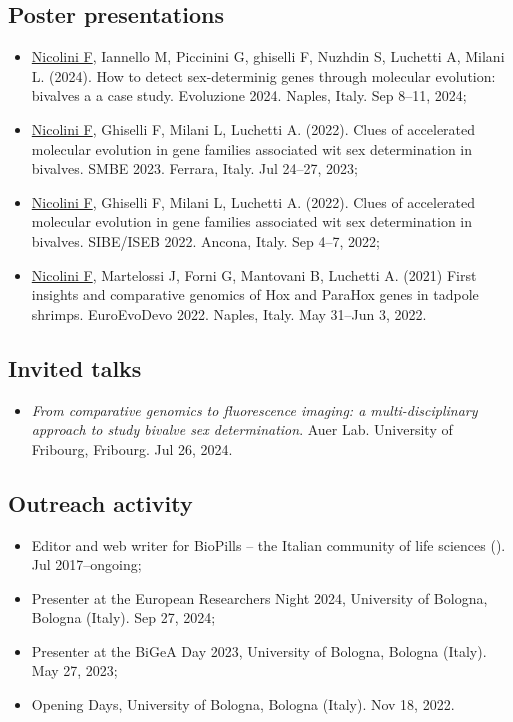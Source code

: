 \subsection*{Poster presentations}
\begin{itemize}
    \item \underline{Nicolini F}, Iannello M, Piccinini G, ghiselli F, Nuzhdin S, Luchetti A, Milani L. (2024). How to detect sex-determinig genes through molecular evolution: bivalves a a case study. Evoluzione 2024. Naples, Italy. Sep 8--11, 2024;
    \item \underline{Nicolini F}, Ghiselli F, Milani L, Luchetti A. (2022). Clues of accelerated molecular evolution in gene families associated wit sex determination in bivalves. SMBE 2023. Ferrara, Italy. Jul 24--27, 2023;
    \item \underline{Nicolini F}, Ghiselli F, Milani L, Luchetti A. (2022). Clues of accelerated molecular evolution in gene families associated wit sex determination in bivalves. SIBE/ISEB 2022. Ancona, Italy. Sep 4--7, 2022;
    \item \underline{Nicolini F}, Martelossi J, Forni G, Mantovani B, Luchetti A. (2021) First insights and comparative genomics of Hox and ParaHox genes in tadpole shrimps. EuroEvoDevo 2022. Naples, Italy. May 31--Jun 3, 2022.
\end{itemize}

\subsection*{Invited talks}
\begin{itemize}
    \item \textit{From comparative genomics to fluorescence imaging: a multi-disciplinary approach to study bivalve sex determination}. Auer Lab. University of Fribourg, Fribourg. Jul 26, 2024.
\end{itemize}

\subsection*{Outreach activity}
\begin{itemize}
    \item Editor and web writer for BioPills -- the Italian community of life sciences (). Jul 2017--ongoing;
    \item Presenter at the European Researchers\curlyapostrophe{} Night 2024, University of Bologna, Bologna (Italy). Sep 27, 2024;
    \item Presenter at the BiGeA Day 2023, University of Bologna, Bologna (Italy). May 27, 2023;
    \item Opening Days, University of Bologna, Bologna (Italy). Nov 18, 2022.
\end{itemize}


